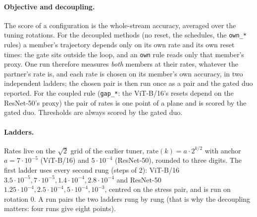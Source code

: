 \documentclass[10pt]{article}
\newcommand{\rl}[1]{\texttt{#1}}
\newcommand{\vit}{ViT-B/16}
\newcommand{\rn}{ResNet-50}
\begin{document}
\paragraph{Objective and decoupling.} The score of a configuration is the whole-stream accuracy, averaged over the tuning rotations. For the decoupled methods (no reset, the schedules, the \rl{own\_*} rules) a member's trajectory depends only on its own rate and its own reset times: the gate sits outside the loop, and an \rl{own} rule reads only that member's proxy. One run therefore measures \emph{both} members at their rates, whatever the partner's rate is, and each rate is chosen on its member's own accuracy, in two independent ladders; the chosen pair is then run once as a pair and the gated duo reported. For the coupled rule (\rl{gap\_*}: the \vit{}'s resets depend on the \rn{}'s proxy) the pair of rates is one point of a plane and is scored by the gated duo. Thresholds are always scored by the gated duo.

\paragraph{Ladders.} Rates live on the $\sqrt2$ grid of the earlier tuner, $\text{rate}(k) = a \cdot 2^{k/2}$ with anchor $a = 7{\cdot}10^{-5}$ (\vit{}) and $5{\cdot}10^{-4}$ (\rn{}), rounded to three digits. The first ladder uses every second rung (steps of 2): \vit{} $3.5 \cdot 10^{-5}, 7 \cdot 10^{-5}, 1.4 \cdot 10^{-4}, 2.8 \cdot 10^{-4}$ and \rn{} $1.25 \cdot 10^{-4}, 2.5 \cdot 10^{-4}, 5 \cdot 10^{-4}, 10^{-3}$, centred on the stress pair, and is run on rotation 0. A run pairs the two ladders rung by rung (that is why the decoupling matters: four runs give eight points).
\end{document}
